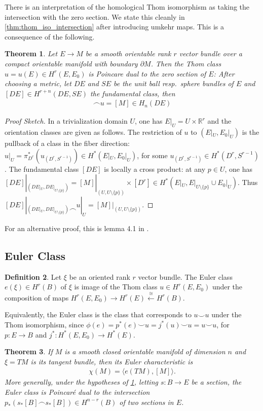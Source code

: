 \documentclass{scrartcl}
\theoremstyle{plain}
\newtheorem{theorem}{Theorem}[section]
\theoremstyle{definition}
\newtheorem{definition}[theorem]{Definition}
\newcommand{\R}{\mathbb R}
\newcommand{\union}{\mathbin{\cup}}
\newcommand{\capp}{\mathbin{\frown}}
\newcommand{\cupp}{\mathbin{\smile}}
\newcommand{\iso}{\cong}
\begin{document}
There is an interpretation of the homological Thom isomorphism as taking the intersection with the zero section. We state this cleanly in \ref{thm:thom_iso_intersection} after introducing umkehr maps. This is a consequence of the following. 

\begin{theorem}\label{thm:thom_class_dual}
    Let $E\to M$ be a smooth orientable rank $r$ vector bundle over a compact orientable manifold with boundary $\partial M$. Then the Thom class $u=u(E)\in H^r(E, E_0)$ is Poincare dual to the zero section of $E$: After choosing a metric, let $DE$ and $SE$ be the unit ball resp.\ sphere bundles of $E$ and $[DE]\in H^{r+n}(DE, SE)$ the fundamental class, then
    \begin{align*}
        [DE] \capp u = [M]\in H_n(DE)
    \end{align*}
\end{theorem}

\begin{proof}[Proof Sketch]
    In a trivialization domain $U$, one has $E|_U = U \times \R^r$ and the orientation classes are given as follows. The restriction of $u$ to $(E|_U, E_0|_U)$ is the pullback of a class in the fiber direction: $u|_U = \pi_{D^r}^{*}\left(u_{(D^r, S^{r-1})}\right)\in H^*(E|_U, E_0|_U)$, for some $u_{(D^r, S^{r-1})}\in H^*(D^r, S^{r-1})$. The fundamental class $[DE]$ is locally a cross product: at any $p\in U$, one has $[DE]|_{(DE|_U, DE|_{U\setminus\{p\}})} = [M]|_{(U, U\setminus\{p\})} \times [D^r] \in H^*(E|_U, E|_{U\setminus\{p\}} \union E_0|_{U})$. Thus $[DE]|_{(DE|_U, DE|_{U\setminus\{p\}})} \capp u|_U = [M]|_{(U, U\setminus\{p\})}$.
\end{proof}

For an alternative proof, this is lemma 4.1 in \cite{hutchings2011cup}. 


\subsection{Euler Class}\label{subsec:euler_class}
\begin{definition}
    Let $\xi$ be an oriented rank $r$ vector bundle. The Euler class $e(\xi)\in H^r(B)$ of $\xi$ is image of the Thom class $u\in H^r(E, E_0)$ under the composition of maps $H^r(E, E_0)\to H^r(E)\xleftarrow{\iso} H^r(B)$.
\end{definition}
Equivalently, the Euler class is the class that corresponds to $u\cupp u$ under the Thom isomorphism, since $\phi(e) = p^*(e) \cupp u = j^*(u)\cupp u = u\cupp u$, for $p\colon E\to B$ and $j^*\colon H^*(E, E_0) \to H^*(E)$. 
\begin{theorem}\label{thm:euler_class}
    If $M$ is a smooth closed orientable manifold of dimension $n$ and $\xi=TM$ is its tangent bundle, then its Euler characteristic is 
    \begin{align*}
        \chi(M) = \langle e(TM), [M]\rangle.
    \end{align*}
    More generally, under the hypotheses of \ref{thm:thom_class_dual}, letting $s\colon B\to E$ be a section, the Euler class is Poincaré dual to the intersection $p_*(s_*[B]\capp s_*[B])\in H^{n-r}(B)$ of two sections in $E$.
\end{theorem}
\end{document}
